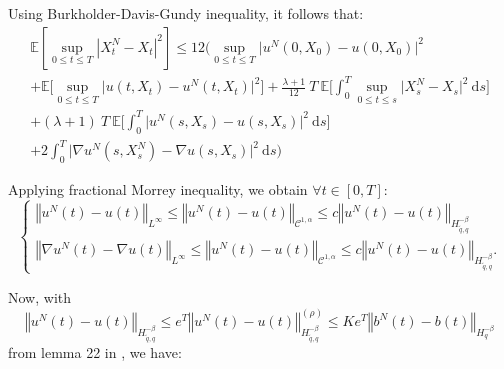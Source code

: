 \documentclass{article}[12pt]
\newcommand{\norme}[1]{\left\Vert #1\right\Vert}
\newcommand{\E}{\mathbb{E}}
\newcommand{\di}{\mathrm{d}}
\begin{document}
        Using Burkholder-Davis-Gundy inequality, it follows that:
        \begin{multline*}
        \E\left[\underset{0\leq t\leq T}{\sup}\left|X^{N}_t-X_t\right|^2\right] \leq 12\Bigg(\underset{0\leq t\leq T}{\sup}\Big|u^N(0,X_0) - u(0,X_0)\Big|^2\\ + \E\bigg[\underset{0\leq t\leq T}{\sup}\Big|u(t,X_t) - u^N(t,X_t)\Big|^2\bigg] + \frac{\lambda+1}{12}\ T\ \E\bigg[\int_0^T \underset{0\leq t\leq s}{\sup}\big|X_s^N- X_s\big|^2\ \di s\bigg]\\ + (\lambda+1)\ T\ \E\bigg[\int_0^T \big|u^N(s,X_s) - u(s,X_s)\big|^2\ \di s\bigg]\\ +2\int_0^T \Big|\nabla u^N(s,X_s^N) - \nabla u(s,X_s)\Big|^2\ \di s \Bigg)
        \end{multline*}
        
        Applying fractional Morrey inequality, we obtain $\forall t\in[0,T]$:
        \begin{equation*}
        \begin{cases}
        \norme{u^N(t) - u(t)}_{L^\infty}\leq\norme{u^N(t) - u(t)}_{\mathcal{C}^{1,\alpha}}\leq c\norme{u^N(t)-u(t)}_{H^{-\beta}_{\tilde{q},q}}\\        
        \norme{\nabla u^N(t) - \nabla u(t)}_{L^\infty}\leq\norme{u^N(t) - u(t)}_{\mathcal{C}^{1,\alpha}}\leq c\norme{u^N(t)-u(t)}_{H^{-\beta}_{\tilde{q},q}}.
        \end{cases}        
        \end{equation*}
        
        Now, with
        \begin{equation*}
        \norme{u^N(t)-u(t)}_{H^{-\beta}_{\tilde{q},q}}\leq e^T \norme{u^N(t)-u(t)}_{H^{-\beta}_{\tilde{q},q}}^{(\rho)}\leq Ke^T\norme{b^N(t)-b(t)}_{H^{-\beta}_{q}}
        \end{equation*} from lemma 22 in \cite{Fla-Iss-Rus-2017}, we have:
        
\end{document}
